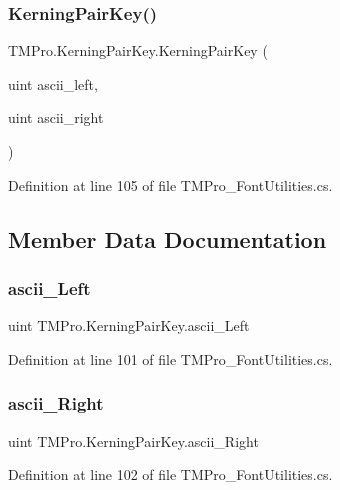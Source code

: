 \subsubsection{\texorpdfstring{KerningPairKey()}{KerningPairKey()}}
{\footnotesize\ttfamily T\+M\+Pro.\+Kerning\+Pair\+Key.\+Kerning\+Pair\+Key (\begin{DoxyParamCaption}\item[{uint}]{ascii\+\_\+left,  }\item[{uint}]{ascii\+\_\+right }\end{DoxyParamCaption})}



Definition at line 105 of file T\+M\+Pro\+\_\+\+Font\+Utilities.\+cs.



\subsection{Member Data Documentation}
\mbox{\label{struct_t_m_pro_1_1_kerning_pair_key_a9e98e6259b156ab204370b1784f3a4a9}} 
\subsubsection{\texorpdfstring{ascii\_Left}{ascii\_Left}}
{\footnotesize\ttfamily uint T\+M\+Pro.\+Kerning\+Pair\+Key.\+ascii\+\_\+\+Left}



Definition at line 101 of file T\+M\+Pro\+\_\+\+Font\+Utilities.\+cs.

\mbox{\label{struct_t_m_pro_1_1_kerning_pair_key_af8b7c50138acb86956a10f9e7ffb23cd}} 
\subsubsection{\texorpdfstring{ascii\_Right}{ascii\_Right}}
{\footnotesize\ttfamily uint T\+M\+Pro.\+Kerning\+Pair\+Key.\+ascii\+\_\+\+Right}



Definition at line 102 of file T\+M\+Pro\+\_\+\+Font\+Utilities.\+cs.

